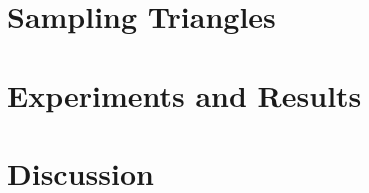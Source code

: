 \documentclass[11pt]{beamer}
\begin{document}
\section{Sampling Triangles}
\begin{frame}

\end{frame}
\section{Experiments and Results}
\begin{frame}
\end{frame}
\section{Discussion}
\begin{frame}
\end{frame}
\end{document}
